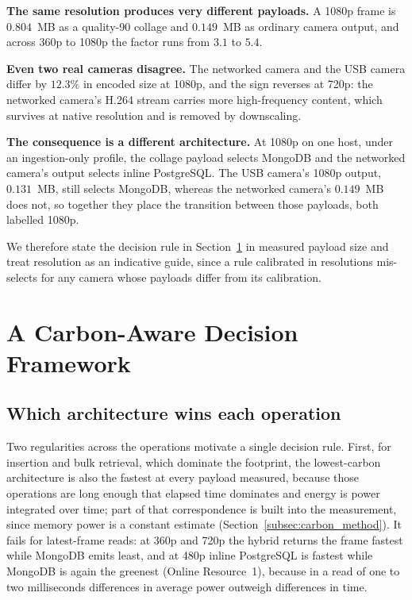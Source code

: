 \documentclass[pdflatex,sn-basic]{sn-jnl}%
\begin{document}
\textbf{The same resolution produces very different payloads.} A 1080p frame is $0.804$~MB as a quality-90 collage and $0.149$~MB as ordinary camera output, and across 360p to 1080p the factor runs from $3.1$ to $5.4$.

\textbf{Even two real cameras disagree.} The networked camera and the USB camera differ by $12.3\%$ in encoded size at 1080p, and the sign reverses at 720p: the networked camera's H.264 stream carries more high-frequency content, which survives at native resolution and is removed by downscaling.

\textbf{The consequence is a different architecture.} At 1080p on one host, under an ingestion-only profile, the collage payload selects MongoDB and the networked camera's output selects inline PostgreSQL. The USB camera's 1080p output, $0.131$~MB, still selects MongoDB, whereas the networked camera's $0.149$~MB does not, so together they place the transition between those payloads, both labelled 1080p.

We therefore state the decision rule in Section~\ref{sec:framework} in measured payload size and treat resolution as an indicative guide, since a rule calibrated in resolutions mis-selects for any camera whose payloads differ from its calibration.

\section{A Carbon-Aware Decision Framework}\label{sec:framework}

\subsection{Which architecture wins each operation}\label{subsec:winners}
Two regularities across the operations motivate a single decision rule. First, for insertion and bulk retrieval, which dominate the footprint, the lowest-carbon architecture is also the fastest at every payload measured, because those operations are long enough that elapsed time dominates and energy is power integrated over time; part of that correspondence is built into the measurement, since memory power is a constant estimate (Section~\ref{subsec:carbon_method}). It fails for latest-frame reads: at 360p and 720p the hybrid returns the frame fastest while MongoDB emits least, and at 480p inline PostgreSQL is fastest while MongoDB is again the greenest (Online Resource~1), because in a read of one to two milliseconds differences in average power outweigh differences in time.
\end{document}
